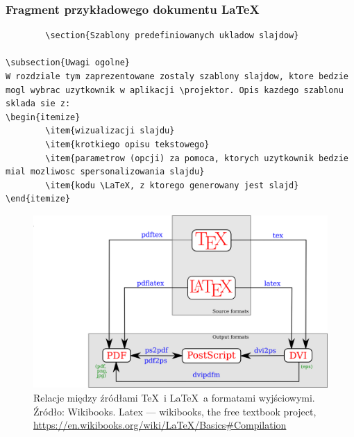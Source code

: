 \documentclass[t]{beamer}
\begin{document}
\begin{frame}[fragile]
	\frametitle{Fragment przykładowego dokumentu \LaTeX}
	\begin{lstlisting}
		\section{Szablony predefiniowanych ukladow slajdow}

\subsection{Uwagi ogolne}
W rozdziale tym zaprezentowane zostaly szablony slajdow, ktore bedzie mogl wybrac uzytkownik w aplikacji \projektor. Opis kazdego szablonu sklada sie z:
\begin{itemize}
        \item{wizualizacji slajdu}
        \item{krotkiego opisu tekstowego}
        \item{parametrow (opcji) za pomoca, ktorych uzytkownik bedzie mial mozliwosc spersonalizowania slajdu}
        \item{kodu \LaTeX, z ktorego generowany jest slajd}
\end{itemize}
	\end{lstlisting}
\end{frame}

\begin{frame}[plain]
	\begin{figure}[T]
		\flushleft
		\hspace{-1cm}\includegraphics[width=\textwidth]{LaTeX_diagram.png}
		\caption{Relacje między źródłami \TeX\ i \LaTeX\ a formatami wyjściowymi. Źródło: Wikibooks. Latex — wikibooks, the free textbook project, \url{https://en.wikibooks.org/wiki/LaTeX/Basics\#Compilation}}
		\label{}
	\end{figure}
\end{frame}
\end{document}
